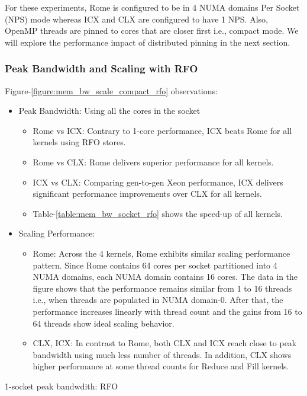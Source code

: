 \documentclass{article}
\begin{document}
For these experiments, Rome is configured to be in 4 NUMA domains Per Socket (NPS) mode whereas ICX and CLX are configured to have 1 NPS. Also, OpenMP threads are pinned to cores that are closer first i.e., compact mode. We will explore the performance impact of distributed pinning in the next section.

\subsubsection{Peak Bandwidth and Scaling with RFO}
Figure-\ref{figure:mem_bw_scale_compact_rfo} observations:
\begin{itemize}
\item Peak Bandwidth: Using all the cores in the socket
\begin{itemize}
\item Rome vs ICX: Contrary to 1-core performance, ICX beats Rome for all kernels using RFO stores.
\item Rome vs CLX: Rome delivers superior performance for all kernels.
\item ICX vs CLX: Comparing gen-to-gen Xeon performance, ICX delivers significant performance improvements over CLX for all kernels.
\item Table-\ref{table:mem_bw_socket_rfo} shows the speed-up of all kernels.
\end{itemize}
\item Scaling Performance: 
\begin{itemize}
\item Rome: Across the 4 kernels, Rome exhibits similar scaling performance pattern. Since Rome contains 64 cores per socket partitioned into 4 NUMA domains, each NUMA domain contains 16 cores. The data in the figure shows that the performance remains similar from 1 to 16 threads i.e., when threads are populated in NUMA domain-0. After that, the performance increases linearly with thread count and the gains from 16 to 64 threads show ideal scaling behavior.
\item CLX, ICX: In contrast to Rome, both CLX and ICX reach close to peak bandwidth using much less number of threads. In addition, CLX shows higher performance at some thread counts for Reduce and Fill kernels. 
\end{itemize}
\end{itemize}

\begin{table}[h!]
\centering

\caption{1-socket peak bandwdith: RFO}
\label{table:mem_bw_socket_rfo}
\end{table}
\end{document}
